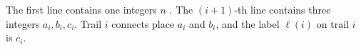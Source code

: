 The first line contains one integers $n$ .
The $(i + 1)$-th line contains three integers 
$a_{i}, b_{i}, c_{i}$. 
Trail $i$ connects place $a_i$ and $b_i$, and the label $\ell(i)$ on trail $i$
is $c_i$. 
